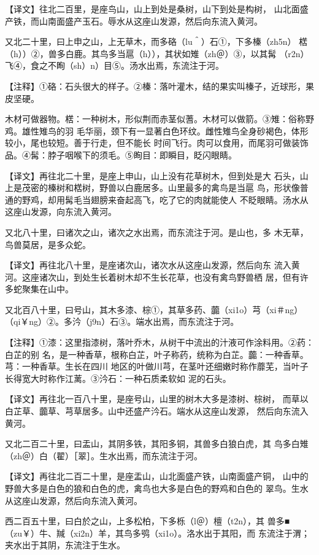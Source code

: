 \documentclass[a4paper,12pt,UTF8,twoside]{ctexbook}
\begin{document}
【译文】往北二百里，是座鸟山，山上到处是桑树，山下到处是构树， 山北面盛产铁，而山南面盛产玉石。辱水从这座山发源，然后向东流入黄河。

又北二十里，曰上申之山，上无草木，而多硌（lu＾）石①，下多榛（zh5n） 楛（h））②，兽多白鹿。其鸟多当扈（h）），其状如雉（zh＠）③，以其髯 （r2n）飞④，食之不眴（sh）n）目⑤。汤水出焉，东流注于河。

【注释】①硌：石头很大的样子。②榛：落叶灌木，结的果实叫榛子，近球形，果皮坚硬。

木材可做器物。楛：一种树木，形似荆而赤茎似蓍。木材可以做箭。③雉：俗称野鸡。雄性雉鸟的羽 毛华丽，颈下有一显著白色环纹。雌性雉鸟全身砂褐色，体形较小，尾也较短。善于行走，但不能长 时间飞行。肉可以食用，而尾羽可做装饰品。④髯：脖子咽喉下的须毛。⑤眴目：即瞬目，眨闪眼睛。

【译文】再往北二十里，是座上申山，山上没有花草树木，但到处是大 石头，山上是茂密的榛树和楛树，野兽以白鹿居多。山里最多的禽鸟是当扈 鸟，形状像普通的野鸡，却用髯毛当翅膀来奋起高飞，吃了它的肉就能使人 不眨眼睛。汤水从这座山发源，向东流入黄河。

又北八十里，曰诸次之山，诸次之水出焉，而东流注于河。是山也，多 木无草，鸟兽莫居，是多众蛇。

【译文】再往北八十里，是座诸次山，诸次水从这座山发源，然后向东 流入黄河。这座诸次山，到处生长着树木却不生长花草，也没有禽鸟野兽栖 居，但有许多蛇聚集在山中。

又北百八十里，曰号山，其木多漆、棕①，其草多药、虈（xi1o）芎（xi＃ng） （qi￥ng）②。多汵（j9n）石③。端水出焉，而东流注于河。

【注释】①漆：这里指漆树，落叶乔木，从树干中流出的汁液可作涂料用。②药：白芷的别 名，是一种香草，根称白芷，叶子称药，统称为白芷。虈：一种香草。芎：一种香草。生长在四川 地区的叶做川芎，在茎叶还细嫩时称作蘼芜，当叶子长得宽大时称作江蓠。③汵石：一种石质柔软如 泥的石头。

【译文】再往北一百八十里，是座号山，山里的树木大多是漆树、棕树， 而草以白芷草、虈草、芎草居多。山中还盛产汵石。端水从这座山发源， 然后向东流入黄河。

又北二百二十里，曰盂山，其阴多铁，其阳多铜，其兽多白狼白虎，其 鸟多白雉（zh＠）白（翟）［翠］。生水出焉，而东流注于河。

【译文】再往北二百二十里，是座盂山，山北面盛产铁，山南面盛产铜， 山中的野兽大多是白色的狼和白色的虎，禽鸟也大多是白色的野鸡和白色的 翠鸟。生水从这座山发源，然后向东流入黄河。

西二百五十里，曰白於之山，上多松柏，下多栎（l＠）檀（t2n），其 兽多■（zu￥）牛、羬（xi2n）羊，其鸟多鸮（xi1o）。洛水出于其阳，而 东流注于渭；夹水出于其阴，东流注于生水。
\end{document}
